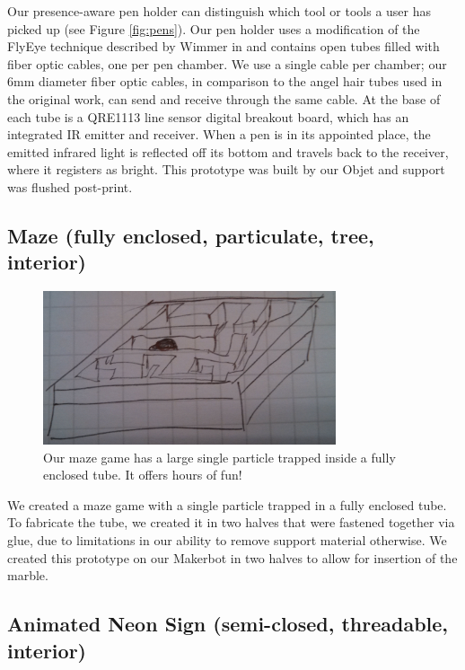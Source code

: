 Our presence-aware pen holder can distinguish which tool or tools a user has picked up (see Figure \ref{fig:pens}).  Our pen holder uses a modification of the FlyEye technique described by Wimmer in \cite{Wimmer-flyeye} and contains open tubes filled with fiber optic cables, one per pen chamber.  We use a single cable per chamber; our 6mm diameter fiber optic cables, in comparison to the angel hair tubes used in the original work, can send and receive through the same cable.  At the base of each tube is a QRE1113 line sensor digital breakout board, which has an integrated IR emitter and receiver.   When a pen is in its appointed place, the emitted infrared light is reflected off its bottom and travels back to the receiver, where it registers as bright.  This prototype was built by our Objet and support was flushed post-print. 

\subsection{Maze (fully enclosed, particulate, tree, interior)}

\begin{figure}[h]
\centering
    \includegraphics[width=3.4in]{figures/placeholder/maze.jpg}
\caption{Our maze game has a large single particle trapped inside a fully enclosed tube.  It offers hours of fun!}
\label{fig:maze}
\end{figure}

We created a maze game with a single particle trapped in a fully enclosed tube.  To fabricate the tube, we created it in two halves that were fastened together via glue, due to limitations in our ability to remove support material otherwise.  We created this prototype on our Makerbot in two halves to allow for insertion of the marble.

\subsection{Animated Neon Sign (semi-closed, threadable, interior)}

